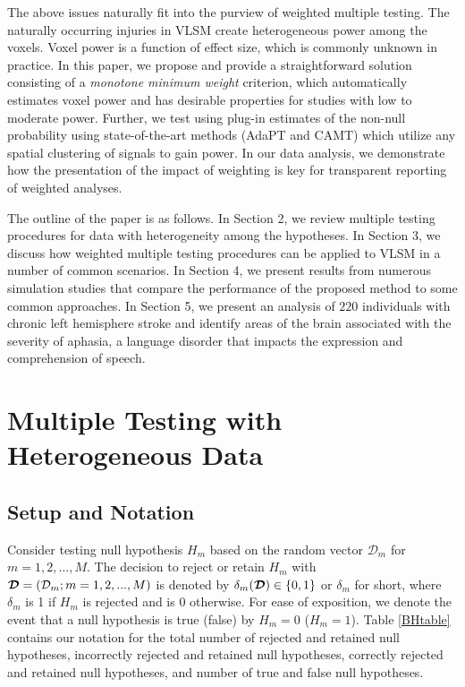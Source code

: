 \documentclass[bimj,fleqn]{w-art}
\newcommand{\mbf}[1]{\mbox{\boldmath${#1}$}}
\theoremstyle{plain}
\theoremstyle{definition}
\begin{document}
The above issues naturally fit into the purview of weighted multiple testing. The naturally occurring injuries in VLSM create heterogeneous power among the voxels. Voxel power is a function of effect size, which is commonly unknown in practice.  In this paper, we propose and provide a straightforward solution consisting of a \emph{monotone minimum weight} criterion, which automatically estimates voxel power and has desirable properties for studies with low to moderate power. Further, we test using plug-in estimates of the non-null probability using state-of-the-art methods (AdaPT and CAMT) which utilize any spatial clustering of signals to gain power. In our data analysis, we demonstrate how the presentation of the impact of weighting is key for transparent reporting of weighted analyses.

The outline of the paper is as follows.  In Section 2, we review multiple testing procedures for data with heterogeneity among the hypotheses.  In Section 3, we discuss how weighted multiple testing procedures can be applied to VLSM in a number of common scenarios. In Section 4, we present results from numerous simulation studies that compare the performance of the proposed method to some common approaches. In Section 5, we present an analysis of $220$ individuals with chronic left hemisphere stroke and identify areas of the brain associated with the severity of aphasia, a language disorder that impacts the expression and comprehension of speech. 



\section{Multiple Testing with Heterogeneous Data}\label{sec.MT_procs}
\subsection{Setup and Notation}
Consider testing null hypothesis $H_m$ based on the random vector $\mathcal{D}_m$ for $m = 1, 2, \ldots, M$. The decision to reject or retain $H_m$ with $\mbf{\mathcal{D}} = (\mathcal{D}_m; m = 1,2,...,M)$ is denoted by $\delta_m(\mbf{\mathcal{D}})\in\{0,1\}$ or $\delta_m$ for short, where $\delta_m$ is 1 if $H_m$ is rejected and is 0 otherwise.  For ease of exposition, we denote the event that a null hypothesis is true (false) by $H_m = 0$ ($H_m = 1$). Table \ref{BHtable} contains our notation for the total number of rejected and retained null hypotheses, incorrectly rejected and retained null hypotheses, correctly rejected and retained null hypotheses, and number of true and false null hypotheses.
\end{document}
